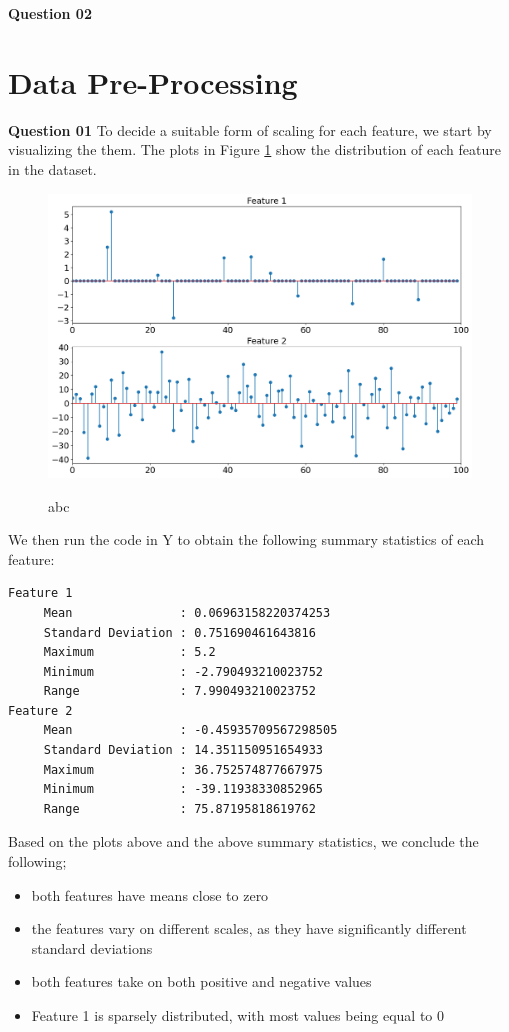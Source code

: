 \documentclass{article}[a4paper]
\begin{document}
	\textbf{Question 02}

	\section{Data Pre-Processing}

	\textbf{Question 01} To decide a suitable form of scaling for each feature, we start by visualizing the
	them. The plots in Figure \ref{q3_1} show the distribution of each feature in the dataset.

	\begin{figure}[H]
		\centering
		\includegraphics[width=0.7\linewidth]{images/q3_1.png}
		\label{q3_1}
		\caption{abc}
	\end{figure}

	We then run the code in Y to obtain the following summary statistics of each feature:
	\begin{verbatim}
Feature 1
	 Mean 				: 0.06963158220374253
	 Standard Deviation : 0.751690461643816
	 Maximum 			: 5.2
	 Minimum 			: -2.790493210023752
	 Range 				: 7.990493210023752
Feature 2
	 Mean 				: -0.45935709567298505
	 Standard Deviation : 14.351150951654933
	 Maximum 			: 36.752574877667975
	 Minimum 			: -39.11938330852965
	 Range 				: 75.87195818619762
	\end{verbatim}

	Based on the plots above and the above summary statistics, we conclude the following;
	\begin{itemize}
		\item both features have means close to zero
		\item the features vary on different scales, as they have significantly different standard deviations
		\item both features take on both positive and negative values
		\item Feature 1 is sparsely distributed, with most values being equal to 0
	\end{itemize}
\end{document}
